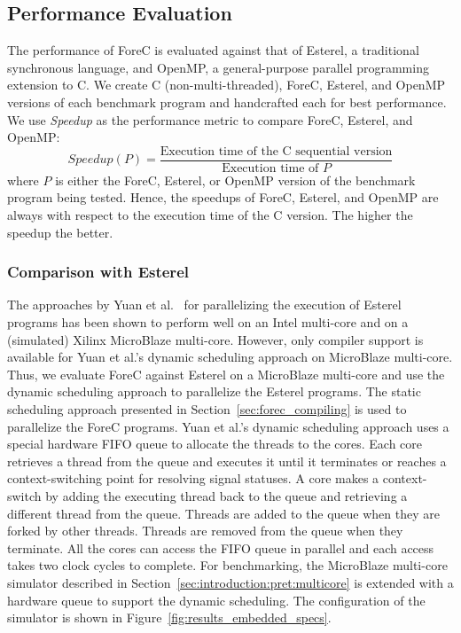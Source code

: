 \subsection{Performance Evaluation}
\label{sec:forec_benchmarking:performance}
The performance of ForeC is evaluated against that of Esterel,
a traditional synchronous language, and OpenMP,
a general-purpose parallel programming extension to C. 
We create C (non-multi-threaded), ForeC, 
Esterel, and OpenMP versions of each benchmark program 
and handcrafted each for best performance. 
We use \emph{Speedup} as the performance metric to compare ForeC, 
Esterel, and OpenMP:
\begin{equation*}
	Speedup(P) = \frac{\text{Execution time of the C sequential version}}{\text{Execution time of }P}
\end{equation*}
where $P$ is either the ForeC, Esterel, or OpenMP version of 
the benchmark program being tested.
Hence, the speedups of ForeC, Esterel, and OpenMP are always
with respect to the execution time of the C version.
The higher the speedup the better.


\subsubsection{Comparison with Esterel}
The approaches by Yuan et al.~\cite{YuanYR11,Yuan13} for
parallelizing the execution of Esterel programs has been shown
to perform well on an Intel multi-core and on a
(simulated) Xilinx MicroBlaze multi-core. However, only
compiler support is available for Yuan et al.'s
dynamic scheduling approach on MicroBlaze multi-core. Thus,
we evaluate ForeC against Esterel on a MicroBlaze
multi-core and use the dynamic scheduling approach to
parallelize the Esterel programs. The static scheduling
approach presented in Section~\ref{sec:forec_compiling} is used
to parallelize the ForeC programs. 
Yuan et al.'s dynamic scheduling approach uses a special hardware 
FIFO queue to allocate the threads to the cores. Each core retrieves 
a thread from the queue and executes it until it terminates or 
reaches a context-switching point for resolving signal statuses. 
A core makes a context-switch by adding the executing thread back 
to the queue and retrieving a different thread from the queue. 
Threads are added to the queue when they are forked by other threads. 
Threads are removed from the queue when they terminate. All the cores 
can access the FIFO queue in parallel and each access takes two clock 
cycles to complete. For benchmarking, the MicroBlaze 
multi-core simulator described in 
Section~\ref{sec:introduction:pret:multicore} is extended 
with a hardware queue to support the dynamic scheduling. 
The configuration of the simulator is shown in 
Figure~\ref{fig:results_embedded_specs}. 

